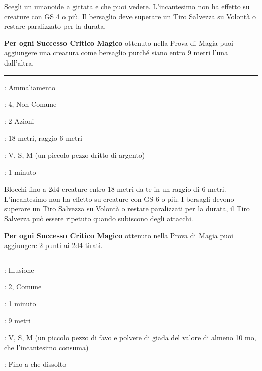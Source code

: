 \begin{multicols}{2}
Scegli un umanoide a gittata e che puoi vedere. L'incantesimo non ha effetto su creature con GS 4 o più. Il bersaglio deve superare un Tiro Salvezza su Volontà o restare paralizzato per la durata.

\textbf{Per ogni Successo Critico Magico} ottenuto nella Prova di Magia puoi aggiungere una creatura come bersaglio purché siano entro 9 metri l'una dall'altra.

\smallskip\noindent\rule{\linewidth}{2pt} \hypertarget{Blocca Persona Avanzato}{}\smallskip{}
\noindent
\begin{description}[noitemsep, topsep=0pt, parsep=0pt, partopsep=0pt, leftmargin=0cm, labelwidth=2.8cm]
	\item[\textbf{Lista di Magia}]: Ammaliamento
	\item[\textbf{Livello}]: 4, Non Comune
	\item[\textbf{T. di Lancio}]: 2 Azioni
	\item[\textbf{Gittata}]: 18 metri, raggio 6 metri
	\item[\textbf{Componenti}]: V, S, M (un piccolo pezzo dritto di argento)
	\item[\textbf{Durata}]: 1 minuto
\end{description}

Blocchi fino a 2d4 creature entro 18 metri da te in un raggio di 6 metri. L'incantesimo non ha effetto su creature con GS 6 o più. I bersagli devono superare un Tiro Salvezza su Volontà o restare paralizzati per la durata, il Tiro Salvezza può essere ripetuto quando subiscono degli attacchi.

\textbf{Per ogni Successo Critico Magico} ottenuto nella Prova di Magia puoi aggiungere 2 punti ai 2d4 tirati.

\smallskip\noindent\rule{\linewidth}{2pt} \hypertarget{Bocca Magica}{}\smallskip{}
\noindent
\begin{description}[noitemsep, topsep=0pt, parsep=0pt, partopsep=0pt, leftmargin=0cm, labelwidth=2.8cm]
	\item[\textbf{Lista di Magia}]: Illusione
	\item[\textbf{Livello}]: 2, Comune
	\item[\textbf{T. di Lancio}]: 1 minuto
	\item[\textbf{Gittata}]: 9 metri
	\item[\textbf{Componenti}]: V, S, M (un piccolo pezzo di favo e polvere di giada del valore di almeno 10 mo, che l'incantesimo consuma)
	\item[\textbf{Durata}]: Fino a che dissolto
\end{description}


\end{multicols}
